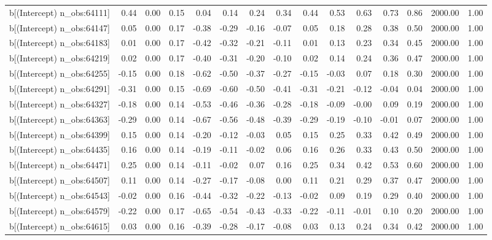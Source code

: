 \begin{table}[ht]
\begin{tabular}{rrrrrrrrrrrrrrr}
  b[(Intercept) n\_obs:64111] & 0.44 & 0.00 & 0.15 & 0.04 & 0.14 & 0.24 & 0.34 & 0.44 & 0.53 & 0.63 & 0.73 & 0.86 & 2000.00 & 1.00 \\ 
  b[(Intercept) n\_obs:64147] & 0.05 & 0.00 & 0.17 & -0.38 & -0.29 & -0.16 & -0.07 & 0.05 & 0.18 & 0.28 & 0.38 & 0.50 & 2000.00 & 1.00 \\ 
  b[(Intercept) n\_obs:64183] & 0.01 & 0.00 & 0.17 & -0.42 & -0.32 & -0.21 & -0.11 & 0.01 & 0.13 & 0.23 & 0.34 & 0.45 & 2000.00 & 1.00 \\ 
  b[(Intercept) n\_obs:64219] & 0.02 & 0.00 & 0.17 & -0.40 & -0.31 & -0.20 & -0.10 & 0.02 & 0.14 & 0.24 & 0.36 & 0.47 & 2000.00 & 1.00 \\ 
  b[(Intercept) n\_obs:64255] & -0.15 & 0.00 & 0.18 & -0.62 & -0.50 & -0.37 & -0.27 & -0.15 & -0.03 & 0.07 & 0.18 & 0.30 & 2000.00 & 1.00 \\ 
  b[(Intercept) n\_obs:64291] & -0.31 & 0.00 & 0.15 & -0.69 & -0.60 & -0.50 & -0.41 & -0.31 & -0.21 & -0.12 & -0.04 & 0.04 & 2000.00 & 1.00 \\ 
  b[(Intercept) n\_obs:64327] & -0.18 & 0.00 & 0.14 & -0.53 & -0.46 & -0.36 & -0.28 & -0.18 & -0.09 & -0.00 & 0.09 & 0.19 & 2000.00 & 1.00 \\ 
  b[(Intercept) n\_obs:64363] & -0.29 & 0.00 & 0.14 & -0.67 & -0.56 & -0.48 & -0.39 & -0.29 & -0.19 & -0.10 & -0.01 & 0.07 & 2000.00 & 1.00 \\ 
  b[(Intercept) n\_obs:64399] & 0.15 & 0.00 & 0.14 & -0.20 & -0.12 & -0.03 & 0.05 & 0.15 & 0.25 & 0.33 & 0.42 & 0.49 & 2000.00 & 1.00 \\ 
  b[(Intercept) n\_obs:64435] & 0.16 & 0.00 & 0.14 & -0.19 & -0.11 & -0.02 & 0.06 & 0.16 & 0.26 & 0.33 & 0.43 & 0.50 & 2000.00 & 1.00 \\ 
  b[(Intercept) n\_obs:64471] & 0.25 & 0.00 & 0.14 & -0.11 & -0.02 & 0.07 & 0.16 & 0.25 & 0.34 & 0.42 & 0.53 & 0.60 & 2000.00 & 1.00 \\ 
  b[(Intercept) n\_obs:64507] & 0.11 & 0.00 & 0.14 & -0.27 & -0.17 & -0.08 & 0.00 & 0.11 & 0.21 & 0.29 & 0.37 & 0.47 & 2000.00 & 1.00 \\ 
  b[(Intercept) n\_obs:64543] & -0.02 & 0.00 & 0.16 & -0.44 & -0.32 & -0.22 & -0.13 & -0.02 & 0.09 & 0.19 & 0.29 & 0.40 & 2000.00 & 1.00 \\ 
  b[(Intercept) n\_obs:64579] & -0.22 & 0.00 & 0.17 & -0.65 & -0.54 & -0.43 & -0.33 & -0.22 & -0.11 & -0.01 & 0.10 & 0.20 & 2000.00 & 1.00 \\ 
  b[(Intercept) n\_obs:64615] & 0.03 & 0.00 & 0.16 & -0.39 & -0.28 & -0.17 & -0.08 & 0.03 & 0.13 & 0.24 & 0.34 & 0.42 & 2000.00 & 1.00 \\ 

\end{tabular}
\end{table}
